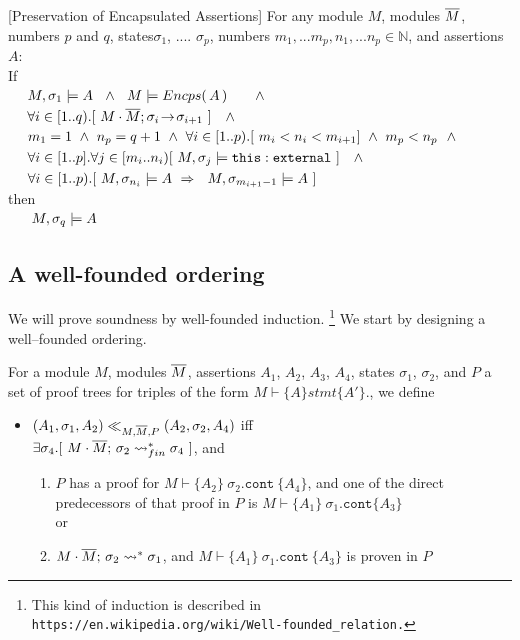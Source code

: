 \begin{auxLemma}
\label{lemma:external_exec_preserves}[Preservation of Encapsulated Assertions]
For any module $M$, modules $\overline{M}$, numbers $p$ and $q$, states$\sigma_1$, .... $\sigma_p$,  numbers $m_1,...m_p, n_1, ... n_p \in \mathbb{N}$, and assertions $A$:
\\
If \\
$\strut \ \ \ \  M, \sigma_1 \models  A   \  \ \wedge \ \ M \models \encaps A \ \ \ \  \ \ \wedge$\\
$\strut \ \ \ \  \forall i\in [1..q).[\   M\cdot \overline{M};\sigma_i\! \rightarrow\! {\sigma_{i+1}}\  ] \  \ \ \wedge$\\
$\strut \ \ \ \  m_1=1 \ \wedge\ n_p=q+1 \  \wedge\ \forall i\in[1..p).[  \  m_i < n_i < m_{i+1}  ] \ \wedge \ m_p<n_p\ \ \wedge  $\\
$\strut \ \ \ \  \forall i\in[1..p].\forall j\in [m_i..n_i)[\   M,\sigma_j \models \texttt{this}:\mbox{\normalfont{\texttt{external}}} \ ] \  \ \ \wedge$\\
$\strut \ \ \ \ \forall i\in[1..p). [ \ M,\sigma_{n_i} \models A   \ \Rightarrow \ \ 
M, {\sigma_{m_{i+1}-1}} \models A  \ ] $ \\
then\\
$\strut \ \ \ \  \ M, \sigma_q \models  A$
\end{auxLemma}



\subsection{A well-founded ordering}
\label{sect:prove:sound}

We will prove soundness by well-founded induction. \footnote{This kind of induction is described in \texttt{https://en.wikipedia.org/wiki/Well-founded\_relation.}}
We start by designing a well--founded ordering. 

\begin{definition}
For a module $M$, modules $\overline{M}$, assertions $A_1$, $A_2$, $A_3$, $A_4$, states $\sigma_1$, $\sigma_2$, and   $P$ a set of proof trees for triples of the form 
$M \vdash \{ A \} stmt  \{ A' \} $., we define
\begin{itemize}
\item
$(A_1,\sigma_1,A_2) \ll_{M,\overline{M},P}  (A_2,\sigma_2,A_4)$ iff
\\
$\exists \sigma_4.[\ M\cdot \overline{M};\, {\sigma_2} \rightsquigarrow^*_{fin} \sigma_4\ ]$, and 
\begin{enumerate}
\item
$P$ has a proof for $M \vdash \{ A_2 \} \ \sigma_2.\texttt{cont}\  \{ A_4 \} $, and one of the direct predecessors of that proof in $P$ is $M \vdash \{ A_1 \}\ \sigma_1.\texttt{cont}  \{ A_3 \} $ \\
or
\item
 $M\cdot \overline{M};\, {\sigma_2} \rightsquigarrow^* \sigma_1$, and $M \vdash \{ A_1 \}\ \sigma_1.\texttt{cont}\  \{ A_3 \} $ is proven in $P$
\end{enumerate}
\end{itemize}
\end{definition}

